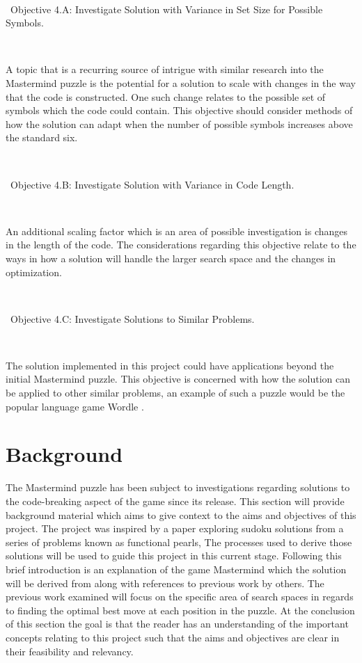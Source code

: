 \documentclass[11pt]{article}  %
\theoremstyle{definition}
\theoremstyle{remark}
\begin{document}
\

\textbullet\ Objective 4.A: Investigate Solution with Variance in Set Size for Possible Symbols.

\

A topic that is a recurring source of intrigue with similar research into the Mastermind puzzle is the potential for a solution to scale with
changes in the way that the code is constructed. One such change relates to the possible set of symbols which the code could contain.
This objective should consider methods of how the solution can adapt when the number of possible symbols increases above the standard six.

\

\textbullet\ Objective 4.B: Investigate Solution with Variance in Code Length.

\

An additional scaling factor which is an area of possible investigation is changes in the length of the code. 
The considerations regarding this objective relate to the ways in how a solution will handle the larger search space and the changes in optimization.

\

\textbullet\ Objective 4.C: Investigate Solutions to Similar Problems.

\

The solution implemented in this project could have applications beyond the initial  Mastermind puzzle. 
This objective is concerned with how the solution can be applied to other similar problems, an example of such a puzzle would be the popular language game Wordle \cite{Wordle}.

%

\newpage                     %
\section{Background}\label{ss:back}

The Mastermind puzzle has been subject to investigations regarding solutions to the code-breaking aspect of the game
since its release.
This section will provide background material which aims to give context to the aims and objectives of this project.
The project was inspired by a paper exploring sudoku solutions from a series of problems known as functional pearls,
The processes used to derive those solutions will be used to guide this project in this current stage.
Following this brief introduction is an explanation of the game Mastermind which the solution will be derived from along
with references to previous work by others. The previous work examined will focus on the specific area of search spaces
in regards to finding the optimal best move at each position in the puzzle. At the conclusion of this section the goal is
that the reader has an understanding of the important concepts relating to this project such that the aims and objectives
are clear in their feasibility and relevancy.
\end{document}
